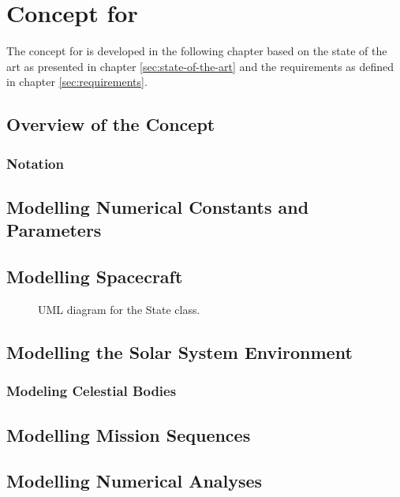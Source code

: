 \chapter{Concept for \topic}
\label{sec:concept}

The concept for \topic is developed in the following chapter based on the state of the art as presented in chapter \ref{sec:state-of-the-art} and the requirements as defined in chapter \ref{sec:requirements}.

\section{Overview of the Concept}


\subsection{Notation}

\section{Modelling Numerical Constants and Parameters}


\section{Modelling Spacecraft}
\begin{figure}[ht]
    \centering
    \caption{UML diagram for the State class.}
    \label{fig:stateuml}
\end{figure}

\section{Modelling the Solar System Environment}

\subsection{Modeling Celestial Bodies}



\section{Modelling Mission Sequences}

\section{Modelling Numerical Analyses}
